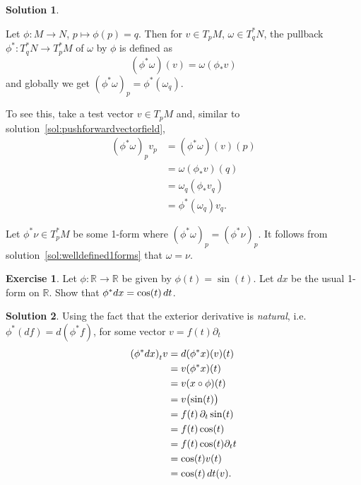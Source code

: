 \documentclass[11pt, a4paper]{report}
\theoremstyle{definition}
\newtheorem{exercise}{Exercise}[part]
\newtheorem{solution}{Solution}[part]
\newenvironment{ex}{\begin{exercise}}{\end{exercise}\pagebreak[1]}
\newenvironment{sol}{\begin{solution}}{\end{solution}\pagebreak[3]}
\newenvironment{nowidthtags}{\usetagform{nowidth}}{\ignorespacesafterend}
\renewcommand*{\d}{\ensuremath\mathop{}\mathopen{}d}
\begin{document}
\begin{sol}\label{sol:pullback1form}

Let $\phi: M \to N$, $p \mapsto \phi(p) = q$. Then for $v \in T_p M$, $\omega \in T_q^* N$, the pullback $\phi^*: T_q^* N \to T_p^* M$ of $\omega$ by $\phi$ is defined as
\begin{nowidthtags}
\[
    (\phi^* \omega)(v) = \omega(\phi_* v) \tag{pullback of a 1-form}\label{eq:pullback1form}
\]
\end{nowidthtags}
and globally we get ${(\phi^* \omega)}_p = \phi^*(\omega_q)$.

To see this, take a test vector $v \in T_p M$ and, similar to solution~\ref{sol:pushforwardvectorfield},
\begin{align*}
    {(\phi^* \omega)}_p v_p &= (\phi^* \omega) (v) (p) \\
        &= \omega(\phi_* v)(q) \\
        &= \omega_q (\phi_* v_q) \\
        &= \phi^* (\omega_q) v_q.
\end{align*}

Let $\phi^*\nu \in T_p^* M$ be some 1-form where ${(\phi^*\omega)}_p = {(\phi^*\nu)}_p$. It follows from solution~\ref{sol:welldefined1forms} that $\omega = \nu$.

\end{sol}

\begin{ex}

Let $\phi: \mathbb{R} \to \mathbb{R}$ be given by $\phi(t) = \sin(t)$. Let $dx$ be the usual 1-form on $\mathbb{R}$. Show that $\phi^*dx = \cos(t) \d t$.

\end{ex}

\begin{sol}

Using the fact that the exterior derivative is \emph{natural}, i.e. $\phi^*(df) = d(\phi^*f)$, for some vector $v = f(t)\partial_t$
\begin{align*}
    {(\phi^* dx)}_t v &= d(\phi^* x) (v)(t) \\
        &= v(\phi^* x) (t) \\
        &= v(x \circ \phi)(t) \\
        &= v \bigl( \sin(t) \bigr) \\
        &= f(t) \, \partial_t \sin(t) \\
        &= f(t) \cos(t) \\
        &= f(t) \cos(t) \partial_t t \\
        &= \cos(t) v(t) \\
        &= \cos(t) \d t(v).
\end{align*}

\end{sol}
\end{document}
